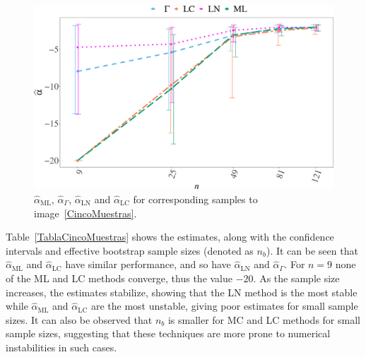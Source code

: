 \documentclass[twocolumn]{svjour3}
\begin{document}
\begin{figure}[hbt]
\centering
\includegraphics[width=\linewidth]{AlfaVsTamCincoMuestrasCorregido_v2}
\caption{ $\widehat{\alpha}_{\text{{ML}}}$, $\widehat{\alpha}_{\Gamma}$, $\widehat{\alpha}_{\text{{LN}}}$ and $\widehat{\alpha}_{\text{{LC}}}$ for corresponding samples to image~\ref{CincoMuestras}.}\label{AlfaVsTamCincoMuestras}
\end{figure}

Table~\ref{TablaCincoMuestras} shows the estimates, along with the confidence intervals and effective bootstrap sample sizes (denoted as $n_b$).
It can be seen that $\widehat{\alpha}_{\text{{ML}}}$ and $\widehat{\alpha}_{\text{{LC}}}$ have similar performance, and so have $\widehat{\alpha}_{\text{{LN}}}$ and $\widehat{\alpha}_{\Gamma}$. 
For $n= 9$ none of the ML and LC methods converge, thus the value $-20$. 
As the sample size increases, the estimates stabilize, showing that the LN method is the most stable while $\widehat{\alpha}_{\text{{ML}}}$ and $\widehat{\alpha}_{\text{{LC}}}$ are the most unstable, giving poor estimates for small sample sizes.
It can also be observed that $n_b$ is smaller for MC and LC methods for small sample sizes, suggesting that these techniques are more prone to numerical instabilities in such cases.
\end{document}
